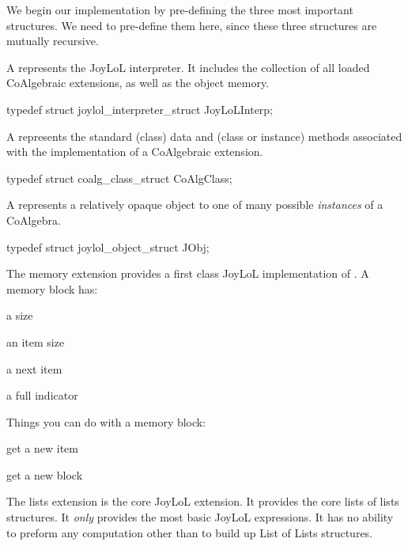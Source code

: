 We begin our implementation by pre-defining the three most important 
structures. We need to pre-define them here, since these three structures 
are mutually recursive. 

\startitemize

\item A  represents the JoyLoL interpreter. It includes 
the collection of all loaded CoAlgebraic extensions, as well as the object 
memory. 

\startCHeader 
typedef struct joylol_interpreter_struct JoyLoLInterp;
\stopCHeader 

\item A  represents the standard (class) data and (class 
or instance) methods associated with the implementation of a CoAlgebraic 
extension. 

\startCHeader
typedef struct coalg_class_struct CoAlgClass;
\stopCHeader

\item A  represents a relatively opaque object to one of 
many possible \emph{instances} of a CoAlgebra. 

\startCHeader
typedef struct joylol_object_struct JObj;
\stopCHeader 
\stopitemize

The memory extension provides a first class JoyLoL implementation of 
. A memory block has:

\startitemize

\item a size

\item an item size

\item a next item

\item a full indicator

\stopitemize

Things you can do with a memory block:

\startitemize

\item get a new item

\item get a new block

\stopitemize


The lists extension is the core JoyLoL extension. It provides the core 
lists of lists structures. It \emph{only} provides the most basic JoyLoL 
expressions. It has no ability to preform any computation other than to 
build up List of Lists structures. 

